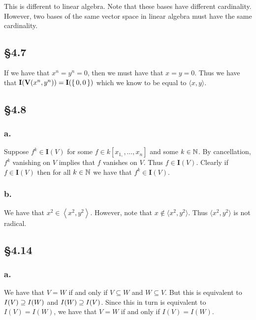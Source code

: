 \documentclass[letterpaper]{article}
\begin{document}
This is different to linear algebra. Note that these bases have different cardinality. However, two bases of the same vector space in linear algebra must have the same cardinality.

\subsection*{\S 4.7}

If we have that $x^{n} = y^{n} = 0$, then we must have that $x = y = 0$. Thus we have that $\mathbf{I}\pqty{\textbf{V}\pqty{x^{n}, y^{n}}} = \mathbf{I}(\set{0, 0})$ which we know to be equal to $\langle x, y \rangle$.

\subsection*{\S 4.8}

\subsubsection*{a.}
Suppose $f^{k} \in \mathbf{I}(V)$ for some $f \in k[x_{1,}, \ldots, x_{n}]$ and some $k \in \mathbb{N}$. By cancellation, $f^{k}$ vanishing on $V$ implies that $f$ vanishes on $V$. Thus $f \in \mathbf{I}(V)$. Clearly if $f \in \mathbf{I}(V)$ then for all $k \in \mathbb{N}$ we have that $f^{k} \in \mathbf{I}(V)$.

\subsubsection*{b.}

We have that $x^{2} \in \left\langle x^{2}, y^{2} \right\rangle$. However, note that $x \notin \langle x^{2}, y^{2} \rangle$. Thus $\langle x^{2}, y^{2} \rangle$ is not radical.

\subsection*{\S 4.14}

\subsubsection*{a.}

We have that $V = W$ if and only if $V \subseteq W$ and $W \subseteq V$.
But this is equivalent to $I(V) \supseteq I(W)$ and $I(W) \supseteq I(V)$.
Since this in turn is equivalent to $I(V) = I(W)$, we have that $V = W$ if and only if $I(V) = I(W)$.
\end{document}
